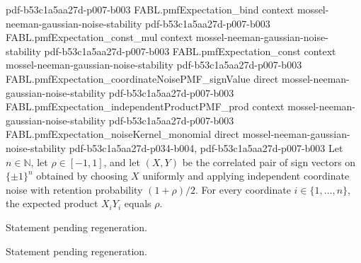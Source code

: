 \begin{theorem}
  {pdf-b53c1a5aa27d-p007-b003}
\proofstep
  {FABL.pmfExpectation_bind}
  {context}
  {mossel-neeman-gaussian-noise-stability}
  {pdf-b53c1a5aa27d-p007-b003}
\proofstep
  {FABL.pmfExpectation_const_mul}
  {context}
  {mossel-neeman-gaussian-noise-stability}
  {pdf-b53c1a5aa27d-p007-b003}
\proofstep
  {FABL.pmfExpectation_const}
  {context}
  {mossel-neeman-gaussian-noise-stability}
  {pdf-b53c1a5aa27d-p007-b003}
\proofstep
  {FABL.pmfExpectation_coordinateNoisePMF_signValue}
  {direct}
  {mossel-neeman-gaussian-noise-stability}
  {pdf-b53c1a5aa27d-p007-b003}
\proofstep
  {FABL.pmfExpectation_independentProductPMF_prod}
  {context}
  {mossel-neeman-gaussian-noise-stability}
  {pdf-b53c1a5aa27d-p007-b003}
\proofstep
  {FABL.pmfExpectation_noiseKernel_monomial}
  {direct}
  {mossel-neeman-gaussian-noise-stability}
  {pdf-b53c1a5aa27d-p034-b004,
    pdf-b53c1a5aa27d-p007-b003}
Let $n\in\mathbb N$, let $\rho\in[-1,1]$, and let $(X,Y)$ be the correlated pair of sign
vectors on $\{\pm1\}^n$ obtained by choosing $X$ uniformly and applying independent
coordinate noise with retention probability $(1+\rho)/2$. For every coordinate
$i\in\{1,\ldots,n\}$, the expected product $X_iY_i$ equals $\rho$.
\end{theorem}

\begin{theorem}
\label{FABL.correlatedSignPairPMF_expect_signValue_fst}
\leanok
{}
Statement pending regeneration.
\end{theorem}

\begin{theorem}
\label{FABL.correlatedSignPairPMF_expect_signValue_snd}
\leanok
{}
Statement pending regeneration.
\end{theorem}

